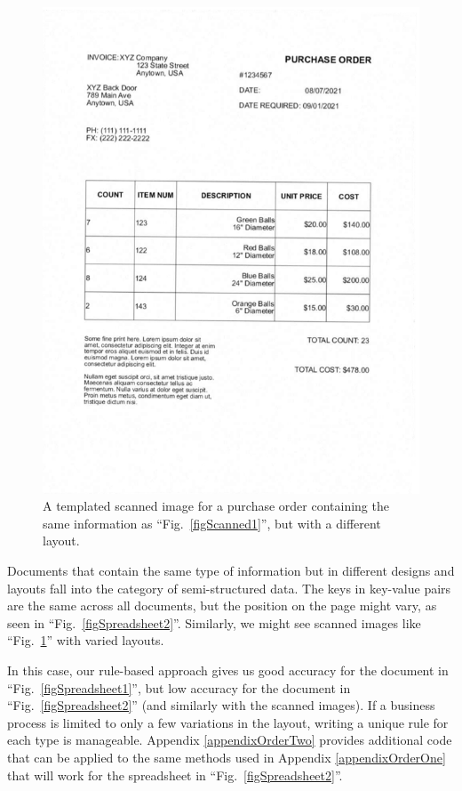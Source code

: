 \documentclass[conference]{IEEEtran}
\begin{document}
\begin{figure}[ht]
\centerline{\includegraphics[width=\columnwidth]{ORDER_2_scanned.png}}
\caption{A templated scanned image for a purchase order containing the same information as ``Fig.~\ref{figScanned1}'', but with a different layout.}
\label{figScanned2}
\end{figure}

Documents that contain the same type of information but in different designs and layouts fall into the category of semi-structured data. The keys in key-value pairs are the same across all documents, but the position on the page might vary, as seen in ``Fig.~\ref{figSpreadsheet2}''. Similarly, we might see scanned images like ``Fig.~\ref{figScanned2}'' with varied layouts.

In this case, our rule-based approach gives us good accuracy for the document in ``Fig.~\ref{figSpreadsheet1}'', but low accuracy for the document in ``Fig.~\ref{figSpreadsheet2}'' (and similarly with the scanned images). If a business process is limited to only a few variations in the layout, writing a unique rule for each type is manageable. Appendix \ref{appendixOrderTwo} provides additional code that can be applied to the same methods used in Appendix \ref{appendixOrderOne} that will work for the spreadsheet in ``Fig.~\ref{figSpreadsheet2}''.
\end{document}

